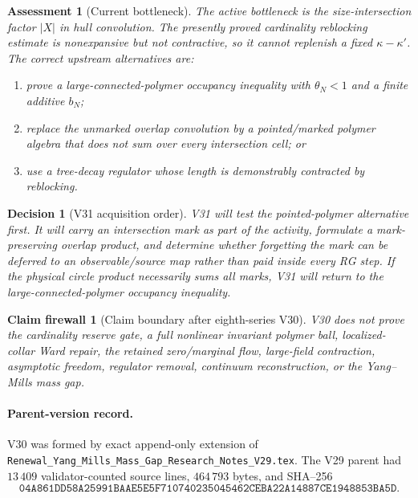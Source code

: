 \documentclass[11pt,oneside]{book}
\newtheorem{assessment}[theorem]{Assessment}
\newtheorem{firewall}[theorem]{Claim firewall}
\newtheorem{decision}[theorem]{Decision}
\theoremstyle{definition}
\theoremstyle{remark}
\begin{document}
\begin{assessment}[Current bottleneck]
\label{ass:e8v30-remains}
The active bottleneck is the size-intersection factor \(|X|\) in hull
convolution.  The presently proved cardinality reblocking estimate is
nonexpansive but not contractive, so it cannot replenish a fixed
\(\kappa-\kappa'\).  The correct upstream alternatives are:
\begin{enumerate}
\item prove a large-connected-polymer occupancy inequality with
\(\theta_N<1\) and a finite additive \(b_N\);
\item replace the unmarked overlap convolution by a pointed/marked
polymer algebra that does not sum over every intersection cell; or
\item use a tree-decay regulator whose length is demonstrably
contracted by reblocking.
\end{enumerate}
\end{assessment}

\begin{decision}[V31 acquisition order]
\label{dec:e8v30-v31}
V31 will test the pointed-polymer alternative first.  It will carry an
intersection mark as part of the activity, formulate a mark-preserving
overlap product, and determine whether forgetting the mark can be
deferred to an observable/source map rather than paid inside every RG
step.  If the physical circle product necessarily sums all marks,
V31 will return to the large-connected-polymer occupancy inequality.
\end{decision}

\begin{firewall}[Claim boundary after eighth-series V30]
\label{fire:e8v30-claim}
V30 does not prove the cardinality reserve gate, a full nonlinear
invariant polymer ball, localized-collar Ward repair, the retained
zero/marginal flow, large-field contraction, asymptotic freedom,
regulator removal, continuum reconstruction, or the Yang--Mills mass
gap.
\end{firewall}

\paragraph{Parent-version record.}
V30 was formed by exact append-only extension of
\texttt{Renewal\_Yang\_Mills\_Mass\_Gap\_Research\_Notes\_V29.tex}.
The V29 parent had \(13\,409\) validator-counted source lines,
\(464\,793\) bytes, and SHA--256
\[
\texttt{04A861DD58A25991BAAE5E5F710740235045462CEBA22A14887CE1948853BA5D}.
\]
\end{document}
